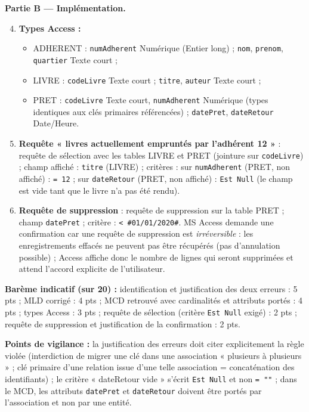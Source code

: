 \documentclass[11pt]{article}
\begin{document}
\begin{corrige}
\textbf{Partie B — Implémentation.}

\begin{enumerate}
  \setcounter{enumi}{3}
  \item \textbf{Types Access :}
  \begin{itemize}
    \item ADHERENT : \texttt{numAdherent} Numérique (Entier long) ; \texttt{nom}, \texttt{prenom}, \texttt{quartier} Texte court ;
    \item LIVRE : \texttt{codeLivre} Texte court ; \texttt{titre}, \texttt{auteur} Texte court ;
    \item PRET : \texttt{codeLivre} Texte court, \texttt{numAdherent} Numérique (types identiques aux clés primaires référencées) ; \texttt{datePret}, \texttt{dateRetour} Date/Heure.
  \end{itemize}
  \item \textbf{Requête « livres actuellement empruntés par l'adhérent 12 »} : requête de sélection avec les tables LIVRE et PRET (jointure sur \texttt{codeLivre}) ; champ affiché : \texttt{titre} (LIVRE) ; critères : sur \texttt{numAdherent} (PRET, non affiché) : \texttt{= 12} ; sur \texttt{dateRetour} (PRET, non affiché) : \texttt{Est Null} (le champ est vide tant que le livre n'a pas été rendu).
  \item \textbf{Requête de suppression} : requête de suppression sur la table PRET ; champ \texttt{datePret} ; critère : \texttt{< \#01/01/2020\#}. MS Access demande une confirmation car une requête de suppression est \emph{irréversible} : les enregistrements effacés ne peuvent pas être récupérés (pas d'annulation possible) ; Access affiche donc le nombre de lignes qui seront supprimées et attend l'accord explicite de l'utilisateur.
\end{enumerate}

\textbf{Barème indicatif (sur 20) :} identification et justification des deux erreurs : 5 pts ; MLD corrigé : 4 pts ; MCD retrouvé avec cardinalités et attributs portés : 4 pts ; types Access : 3 pts ; requête de sélection (critère \texttt{Est Null} exigé) : 2 pts ; requête de suppression et justification de la confirmation : 2 pts.

\textbf{Points de vigilance :} la justification des erreurs doit citer explicitement la règle violée (interdiction de migrer une clé dans une association « plusieurs à plusieurs » ; clé primaire d'une relation issue d'une telle association = concaténation des identifiants) ; le critère « dateRetour vide » s'écrit \texttt{Est Null} et non \texttt{= ""} ; dans le MCD, les attributs \texttt{datePret} et \texttt{dateRetour} doivent être portés par l'association et non par une entité.
\end{corrige}
\end{document}
